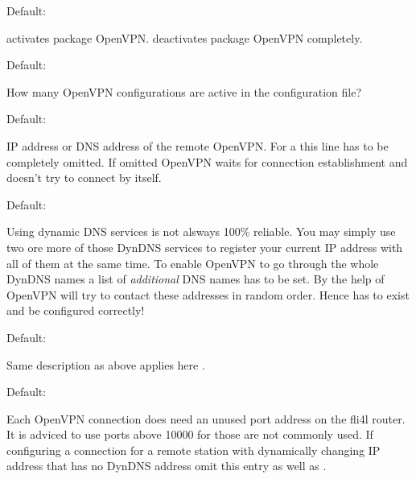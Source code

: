 \begin{description}


  Default: 

   activates package OpenVPN. 
   deactivates package OpenVPN completely.


  Default: 

  How many OpenVPN configurations are active in the configuration file?


  Default: 

  IP address or DNS address of the remote OpenVPN. For a  
  this line has to be completely omitted. If omitted OpenVPN waits for connection 
  establishment and doesn't try to connect by itself.


  Default: 

  Using dynamic DNS services is not alsways 100\% reliable. You may simply 
  use two ore more of those DynDNS services to register your current IP 
  address with all of them at the same time. To enable OpenVPN to go through 
  the whole DynDNS names a list of \emph{additional} DNS names has to be set. 
  By the help of  OpenVPN will try to contact 
  these addresses in random order. Hence  
  has to exist and be configured correctly!


  Default: 

  Same description as above applies here
  .


  Default: 

  Each OpenVPN connection does need an unused port address on the fli4l 
  router. It is adviced to use ports above 10000 for those are not 
  commonly used. If configuring a connection for a remote station with 
  dynamically changing IP address that has no DynDNS address omit 
  this entry as well as .


\end{description}
